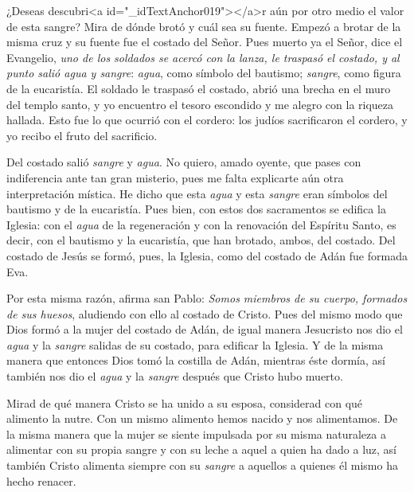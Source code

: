 			\begin{body}¿Deseas descubri<a id="_idTextAnchor019"></a>r aún por otro medio el valor de esta sangre? Mira de dónde brotó y cuál sea su fuente. Empezó a brotar de la misma cruz y su fuente fue el costado del Señor. Pues muerto ya el Señor, dice el Evangelio, \textit{uno de los soldados se acercó con la lanza, le traspasó el costado, y al punto salió agua y sangre}: \textit{agua}, como símbolo del bautismo; \textit{sangre}, como figura de la eucaristía. El soldado le traspasó el costado, abrió una brecha en el muro del templo santo, y yo encuentro el tesoro escondido y me alegro con la riqueza hallada. Esto fue lo que ocurrió con el cordero: los judíos sacrificaron el cordero, y yo recibo el fruto del sacrificio.\end{body}
			
			\begin{body}Del costado salió \textit{sangre} y \textit{agua}. No quiero, amado oyente, que pases con indiferencia ante tan gran misterio, pues me falta explicarte aún otra interpretación mística. He dicho que esta \textit{agua} y esta \textit{sangre} eran símbolos del bautismo y de la eucaristía. Pues bien, con estos dos sacramentos se edifica la Iglesia: con el \textit{agua} de la regeneración y con la renovación del Espíritu Santo, es decir, con el bautismo y la eucaristía, que han brotado, ambos, del costado. Del costado de Jesús se formó, pues, la Iglesia, como del costado de Adán fue formada Eva.\end{body}
			
			\begin{body}Por esta misma razón, afirma san Pablo: \textit{Somos miembros de su cuerpo, formados de sus huesos}, aludiendo con ello al costado de Cristo. Pues del mismo modo que Dios formó a la mujer del costado de Adán, de igual manera Jesucristo nos dio el \textit{agua} y la \textit{sangre }salidas de su costado, para edificar la Iglesia. Y de la misma manera que entonces Dios tomó la costilla de Adán, mientras éste dormía, así también nos dio el \textit{agua} y la \textit{sangre} después que Cristo hubo muerto.\end{body}
			
			\begin{body}Mirad de qué manera Cristo se ha unido a su esposa, considerad con qué alimento la nutre. Con un mismo alimento hemos nacido y nos alimentamos. De la misma manera que la mujer se siente impulsada por su misma naturaleza a alimentar con su propia sangre y con su leche a aquel a quien ha dado a luz, así también Cristo alimenta siempre con su \textit{sangre} a aquellos a quienes él mismo ha hecho renacer.\end{body}
			
